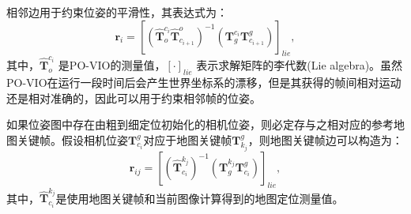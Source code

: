 相邻边用于约束位姿的平滑性，其表达式为：
\begin{equation}
    \symbf{r}_i = [(\hat{\symbf{T}}^{c_i}_{o} \hat{\symbf{T}}^{o}_{c_{i+1}})^{-1} (\symbf{T}^{c_{i}}_g \symbf{T}_{c_{i+1}}^g)]_{lie},
\end{equation}
其中，$\hat{\symbf{T}}^{c_i}_{o}$ 是PO-VIO的测量值，$[\cdot]_{lie}$ 表示求解矩阵的李代数(Lie algebra)\cite{bourbaki1989lie}。虽然PO-VIO在运行一段时间后会产生世界坐标系的漂移，但是其获得的帧间相对运动还是相对准确的，因此可以用于约束相邻帧的位姿。

如果位姿图中存在由粗到细定位初始化的相机位姿，则必定存与之相对应的参考地图关键帧。假设相机位姿$\symbf{T}_{c_{i}}^g$对应于地图关键帧$\symbf{T}_{k_{j}}^g$，则地图关键帧边可以构造为：
\begin{equation}
    \symbf{r}_{ij} = [(\hat{\symbf{T}}^{k_j}_{c_{i}})^{-1} (\symbf{T}^{k_{j}}_g \symbf{T}_{c_{i}}^g)]_{lie},
\end{equation}
其中，$\hat{\symbf{T}}^{k_j}_{c_{i}}$是使用地图关键帧和当前图像计算得到的地图定位测量值。

